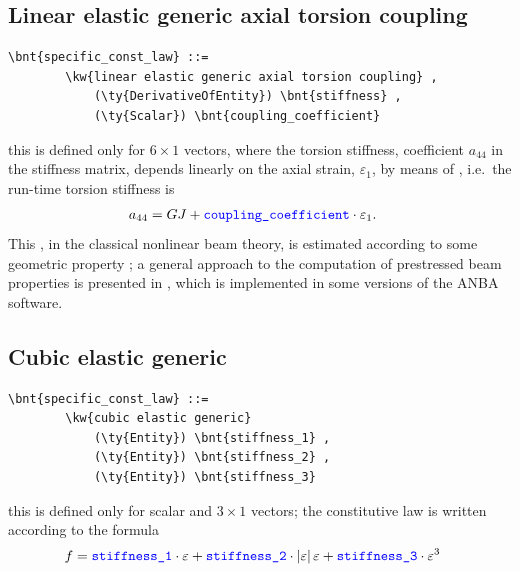 \subsection{Linear elastic generic axial torsion coupling}
\label{sec:CONSTITUTIVE-LAWS:LINEAR-ELASTIC-GENERIC-AXIAL-TORSION-COUPLING}
\begin{Verbatim}[commandchars=\\\{\}]
    \bnt{specific_const_law} ::= 
        \kw{linear elastic generic axial torsion coupling} ,
            (\ty{DerivativeOfEntity}) \bnt{stiffness} ,
            (\ty{Scalar}) \bnt{coupling_coefficient}
\end{Verbatim}
this is defined only for $6 \times 1$ vectors, where the torsion stiffness,
coefficient $ a_{44} $ in the stiffness matrix, depends linearly on 
the axial strain, $ \varepsilon_1 $, by means of 
, i.e.\ the run-time torsion stiffness is 
\begin{align}
	a_{44}
	&=
	GJ + \textcolor{blue}{\texttt{coupling\_coefficient}} \cdot \varepsilon_1 .
\end{align}
This , in the classical nonlinear beam theory,
is estimated according to some geometric property \cite{HOUBOLT-BROOKS-1957};
a general approach to the computation of prestressed beam properties
is presented in \cite{BORRI-MERLINI}, which is implemented in some versions
of the ANBA software.

\subsection{Cubic elastic generic}
\begin{Verbatim}[commandchars=\\\{\}]
    \bnt{specific_const_law} ::= 
        \kw{cubic elastic generic}
            (\ty{Entity}) \bnt{stiffness_1} ,
            (\ty{Entity}) \bnt{stiffness_2} ,
            (\ty{Entity}) \bnt{stiffness_3}
\end{Verbatim}
this is defined only for scalar and $3 \times 1$ vectors; the constitutive
law is written according to the formula
\begin{align}
	f
	&=
	\textcolor{blue}{\texttt{stiffness\_1}} \cdot \varepsilon
	+ \textcolor{blue}{\texttt{stiffness\_2}} \cdot \left| \varepsilon \right|\varepsilon
	+ \textcolor{blue}{\texttt{stiffness\_3}} \cdot \varepsilon^3
\end{align}
%

